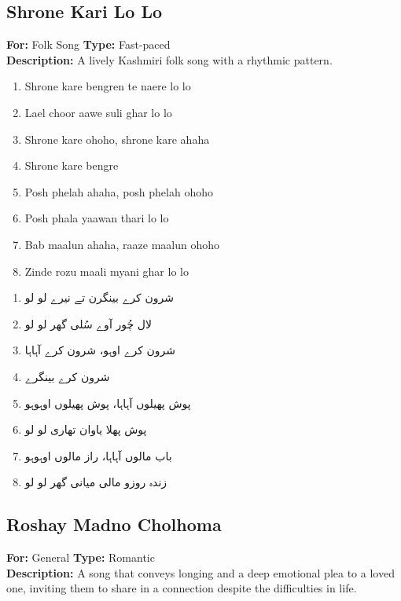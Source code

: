 \documentclass[12pt]{article}
\newcommand{\bigroman}[1]{\fontsize{16pt}{18pt}\selectfont\RaggedRight #1}
\newcommand{\bigarabic}[1]{\fontsize{16pt}{18pt}\selectfont \textarabic{#1}}
\begin{document}
\subsection*{Shrone Kari Lo Lo}
\textbf{For:} Folk Song \quad \textbf{Type:} Fast-paced\\
\textbf{Description:} A lively Kashmiri folk song with a rhythmic pattern.

\begin{multicols}{2}
\begin{enumerate}[leftmargin=*, label=\arabic*., font=\fontsize{16pt}{18pt}\selectfont]
  \item \bigroman{Shrone kare bengren te naere lo lo}
  \item \bigroman{Lael choor aawe suli ghar lo lo}
  \item \bigroman{Shrone kare ohoho, shrone kare ahaha}
  \item \bigroman{Shrone kare bengre}
  \item \bigroman{Posh phelah ahaha, posh phelah ohoho}
  \item \bigroman{Posh phala yaawan thari lo lo}
  \item \bigroman{Bab maalun ahaha, raaze maalun ohoho}
  \item \bigroman{Zinde rozu maali myani ghar lo lo}
\end{enumerate}

\columnbreak

\begin{RTL}
\begin{enumerate}[leftmargin=*, label=\arabic*., font=\fontsize{16pt}{18pt}\selectfont]
  \item \bigarabic{شرون کرے بینگرن تے نیرے لو لو}
  \item \bigarabic{لال چُور آوے سُلی گھر لو لو}
  \item \bigarabic{شرون کرے اوہو، شرون کرے آہاہا}
  \item \bigarabic{شرون کرے بینگرے}
  \item \bigarabic{پوش پھیلوں آہاہا، پوش پھیلوں اوہوہو}
  \item \bigarabic{پوش پھلا یاوان تھاری لو لو}
  \item \bigarabic{باب مالوں آہاہا، راز مالوں اوہوہو}
  \item \bigarabic{زندہ روزو مالی میانی گھر لو لو}
\end{enumerate}
\end{RTL}
\end{multicols}
\subsection*{Roshay Madno Cholhoma}
\textbf{For:} General \quad \textbf{Type:} Romantic\\
\textbf{Description:} A song that conveys longing and a deep emotional plea to a loved one, inviting them to share in a connection despite the difficulties in life.
\end{document}
